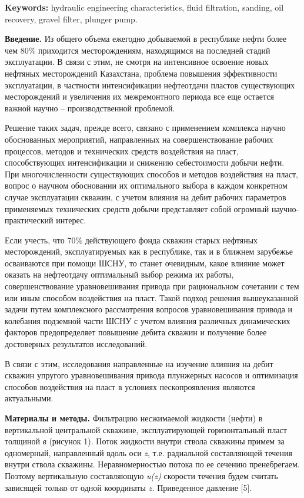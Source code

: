 {\bfseries Keywords:} hydraulic engineering characteristics, fluid
filtration, sanding, oil recovery, gravel filter, plunger pump.

\begin{multicols}{2}
{\bfseries Введение.} Из общего объема ежегодно добываемой в республике
нефти более чем 80\% приходится месторождениям, находящимся на последней
стадий эксплуатации. В связи с этим, не смотря на интенсивное освоение
новых нефтяных месторождений Казахстана, проблема повышения
эффективности эксплуатации, в частности интенсификации нефтеотдачи
пластов существующих месторождений и увеличения их межремонтного периода
все еще остается важной научно -- производственной проблемой.

Решение таких задач, прежде всего, связано с применением комплекса
научно обоснованных мероприятий, направленных на совершенствование
рабочих процессов, методов и технических средств воздействия на пласт,
способствующих интенсификации и снижению себестоимости добычи нефти. При
многочисленности существующих способов и методов воздействия на пласт,
вопрос о научном обосновании их оптимального выбора в каждом конкретном
случае эксплуатации скважин, с учетом влияния на дебит рабочих
параметров применяемых технических средств добычи представляет собой
огромный научно-практический интерес.

Если учесть, что 70\% действующего фонда скважин старых нефтяных
месторождений, эксплуатируемых как в республике, так и в ближнем
зарубежье осваиваются при помощи ШСНУ, то станет очевидным, какое
влияние может оказать на нефтеотдачу оптимальный выбор режима их работы,
совершенствование уравновешивания привода при рациональном сочетании с
тем или иным способом воздействия на пласт. Такой подход решения
вышеуказанной задачи путем комплексного рассмотрения вопросов
уравновешивания привода и колебания подземной части ШСНУ с учетом
влияния различных динамических факторов предопределяет повышение дебита
скважин и получение более достоверных результатов исследований.

В связи с этим, исследования направленные на изучение влияния на дебит
скважин упругого уравновешивания привода плунжерных насосов и
оптимизация способов воздействия на пласт в условиях пескопроявления
являются актуальными.

{\bfseries Материалы и методы.} Фильтрацию несжимаемой жидкости (нефти) в
вертикальной центральной скважине, эксплуатирующей горизонтальный пласт
толщиной \emph{в} (рисунок 1). Поток жидкости внутри ствола скважины
примем за одномерный, направленный вдоль оси \emph{z}, т.е. радиальной
составляющей течения внутри ствола скважины. Неравномерностью потока по
ее сечению пренебрегаем. Поэтому вертикальную составляющую \emph{u(z)}
скорости течения будем считать зависящей только от одной координаты
\emph{z.} Приведенное давление {[}5{]}.


\end{multicols}
